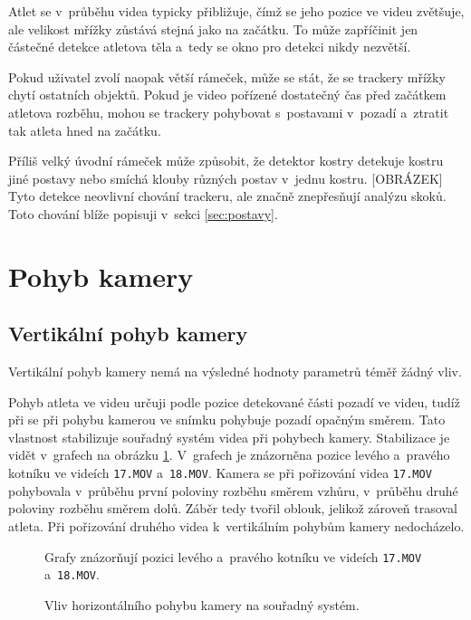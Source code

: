 Atlet se v~průběhu videa typicky přibližuje, čímž se jeho pozice ve videu zvětšuje, ale velikost mřížky zůstává stejná jako na začátku. To může zapříčinit jen částečné detekce atletova těla a~tedy se okno pro detekci nikdy nezvětší.

Pokud uživatel zvolí naopak větší rámeček, může se stát, že se trackery mřížky chytí ostatních objektů. Pokud je video pořízené dostatečný čas před začátkem atletova rozběhu, mohou se trackery pohybovat s~postavami v~pozadí a~ztratit tak atleta hned na začátku.

Příliš velký úvodní rámeček může způsobit, že detektor kostry detekuje kostru jiné postavy nebo smíchá klouby různých postav v~jednu kostru. [OBRÁZEK] Tyto detekce neovlivní chování trackeru, ale značně znepřesňují analýzu skoků. Toto chování blíže popisuji v~sekci \ref{sec:postavy}.




\section{Pohyb kamery}

\subsection{Vertikální pohyb kamery}

Vertikální pohyb kamery nemá na výsledné hodnoty parametrů téměř žádný vliv.

Pohyb atleta ve videu určuji podle pozice detekované části pozadí ve videu, tudíž při se při pohybu kamerou ve snímku pohybuje pozadí opačným směrem. Tato vlastnost stabilizuje souřadný systém videa při pohybech kamery. Stabilizace je vidět v~grafech na obrázku \ref{fig:vpohyb}. V~grafech je znázorněna pozice levého a~pravého kotníku ve videích \texttt{17.MOV} a~\texttt{18.MOV}. Kamera se při pořizování videa \texttt{17.MOV} pohybovala v~průběhu první poloviny rozběhu směrem vzhůru, v~průběhu druhé poloviny rozběhu směrem dolů. Záběr tedy tvořil oblouk, jelikož zároveň trasoval atleta. Při pořizování druhého videa k~vertikálním pohybům kamery nedocházelo.

\begin{figure}[h]\centering
    \caption{Vliv horizontálního pohybu kamery na souřadný systém.}
    \small
    Grafy znázorňují pozici levého a~pravého kotníku ve videích \texttt{17.MOV} a~\texttt{18.MOV}.
    \label{fig:vpohyb}
\end{figure}

